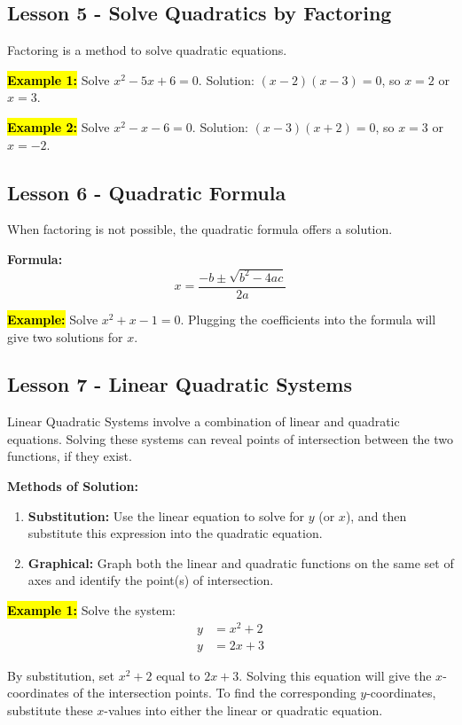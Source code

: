 \documentclass[12pt,a4paper]{article}
\begin{document}
\subsection*{Lesson 5 - Solve Quadratics by Factoring}
Factoring is a method to solve quadratic equations.

\textbf{\hl{Example 1:}} Solve \(x^2 - 5x + 6 = 0\). Solution: \((x - 2)(x - 3) = 0\), so \(x = 2\) or \(x = 3\).

\textbf{\hl{Example 2:}} Solve \(x^2 - x - 6 = 0\). Solution: \((x - 3)(x + 2) = 0\), so \(x = 3\) or \(x = -2\).

\subsection{Lesson 6 - Quadratic Formula}
When factoring is not possible, the quadratic formula offers a solution.

\textbf{Formula:}
\[x = \frac{-b \pm \sqrt{b^2 - 4ac}}{2a}\]

\textbf{\hl{Example:}} Solve \(x^2 + x - 1 = 0\). Plugging the coefficients into the formula will give two solutions for \(x\).

\subsection{Lesson 7 - Linear Quadratic Systems}

Linear Quadratic Systems involve a combination of linear and quadratic equations. Solving these systems can reveal points of intersection between the two functions, if they exist.

\textbf{Methods of Solution:}
\begin{enumerate}
    \item \textbf{Substitution:} Use the linear equation to solve for \(y\) (or \(x\)), and then substitute this expression into the quadratic equation.
    \item \textbf{Graphical:} Graph both the linear and quadratic functions on the same set of axes and identify the point(s) of intersection.
\end{enumerate}

\textbf{\hl{Example 1:}} Solve the system:
\[
\begin{aligned}
    y &= x^2 + 2 \\
    y &= 2x + 3
\end{aligned}
\]

By substitution, set \(x^2 + 2\) equal to \(2x + 3\). Solving this equation will give the \(x\)-coordinates of the intersection points. To find the corresponding \(y\)-coordinates, substitute these \(x\)-values into either the linear or quadratic equation.
\end{document}
